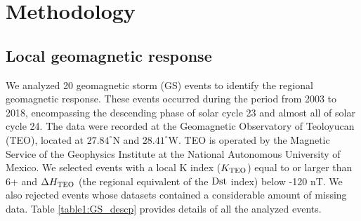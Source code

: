 \documentclass[a4paper,fleqn]{cas-dc}
\begin{document}
\section{Methodology}
\label{Methodology}

\subsection{Local geomagnetic response}
\label{local response}

We analyzed 20 geomagnetic storm (GS) events to identify the regional geomagnetic response. These events occurred during the period from 2003 to 2018, encompassing the descending phase of solar cycle 23 and almost all of solar cycle 24. The data were recorded at the Geomagnetic Observatory of Teoloyucan (TEO), located at $27.84^\circ$N and $28.41^\circ$W. TEO is operated by the Magnetic Service of the Geophysics Institute at the National Autonomous University of Mexico. We selected events with a local K index ($K_{\rm TEO}$) equal to or larger than 6+ and $\Delta {H_{\rm TEO}}$ (the regional equivalent of the ${\rm Dst}$ index) below -120 nT. We also rejected events whose datasets contained a considerable amount of missing data. Table \ref{table1:GS_descp} provides details of all the analyzed events.
\end{document}
